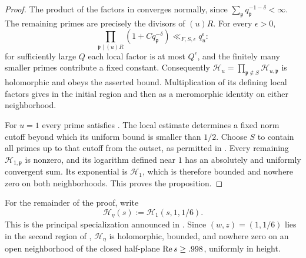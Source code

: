 \begin{proof}
The product of the factors in  converges
normally, since \(\sum_{\mathfrak p}q_{\mathfrak p}^{-1-\delta}<\infty\).
The remaining primes are precisely the divisors of \((u)R\).  For every
\(\epsilon>0\),
\[
 \prod_{\mathfrak p\mid(u)R}(1+Cq_{\mathfrak p}^{-\delta})
       \ll_{F,S,\epsilon}q_u^\epsilon:
\]
for sufficiently large \(Q\) each local factor is at most \(Q^\epsilon\),
and the finitely many smaller primes contribute a fixed constant.
Consequently \(\mathcal H_u=\prod_{\mathfrak p\notin S}
\mathcal H_{u,\mathfrak p}\) is holomorphic and obeys the asserted bound.
Multiplication of its defining local factors gives
 in the initial region and then as a
meromorphic identity on either neighborhood.

For \(u=1\) every prime satisfies .  The local
estimate determines a fixed norm cutoff beyond which its uniform bound
is smaller than \(1/2\).  Choose \(S\) to contain all primes up to that
cutoff from the outset, as permitted in .  Every remaining
\(\mathcal H_{1,\mathfrak p}\) is nonzero, and its logarithm defined near
\(1\) has an absolutely and uniformly convergent sum.  Its exponential is
\(\mathcal H_1\), which is therefore bounded and nowhere zero on both
neighborhoods.  This proves the proposition.
\end{proof}

For the remainder of the proof, write
\[
 \mathcal H_\eta(s):=\mathcal H_1(s,1,1/6).
\]
This is the principal specialization announced in
.  Since \((w,z)=(1,1/6)\) lies in the
second region of , \(\mathcal H_\eta\) is
holomorphic, bounded, and nowhere zero on an open neighborhood of the
closed half-plane \(\operatorname{Re} s\ge .998\), uniformly in height.
